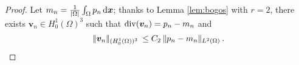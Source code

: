 \documentclass{amsart}
\numberwithin{equation}{section}
\begin{document}
\begin{proof}
Let $m_n=\frac 1 {\vert \Omega \vert} \int_\Omega p_n{\, {\rm d}{{\boldsymbol x}}}$; thanks to Lemma \ref{lem:bogos} with $r =2$, there exists ${\bm{v}}_n \in H^1_0(\Omega)^3$ such that ${{\rm div}}({\bm{v}}_n)=p_n-m_n$ and 
\begin{equation}                                                                                                                                                      {\hspace{.2em}|\hspace{-.1em}| {{\bm{v}}_n} |\hspace{-.1em}|_{{(H^{1}_0(\Omega))^3}}\hspace{.2em}}  \le C_2 {\hspace{.2em}|\hspace{-.1em}| {p_n-m_n} |\hspace{-.1em}|_{{L^{2}(\Omega)}}\hspace{.2em}}.   \label{eq:necas}                                                                                                                                                                          \end{equation}
  

\end{proof}
\end{document}
